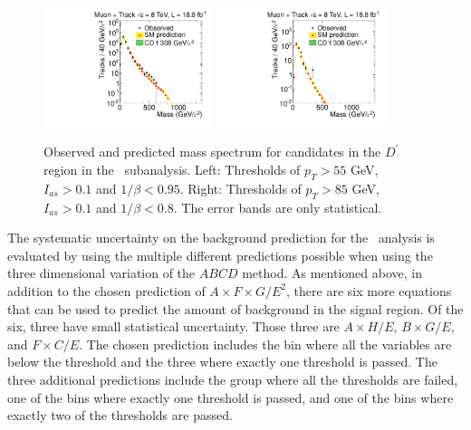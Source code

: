 \begin{figure}
 \begin{center}
  \includegraphics[clip=true, trim=0.0cm 0cm 2.8cm 0cm,width=0.44\textwidth]{figures/tkmu/RescaleNoRatio_Mass_Flip_8TeV_LooseNoSMMC}
  \includegraphics[clip=true, trim=0.0cm 0cm 2.8cm 0cm,width=0.44\textwidth]{figures/tkmu/RescaleNoRatio_Mass_Flip_8TeV_TightNoSMMC}
 \end{center}
 \caption[Observed and predicted mass spectrum for candidates in the \invbeta\ $<$ 1 region in the \tktof\ analysis.]
{Observed and predicted mass spectrum for candidates in the $D^\prime$ region in the \tktof\ subanalysis.
Left: Thresholds of $p_T > 55$ GeV, $I_{as} > 0.1$ and $1/\beta < 0.95$.
Right: Thresholds of $p_T > 85$ GeV, $I_{as} > 0.1$ and $1/\beta < 0.8$.
The error bands are only statistical.}
\label{fig:FlipMassDistribution}
\end{figure}

The systematic uncertainty on the background prediction for the \tktof\ analysis is evaluated by using the multiple different predictions possible when using the
three dimensional variation of the $ABCD$ method. As mentioned above, in addition to the chosen prediction of $A\times F\times G/E^2$, 
there are six more equations that can be used to predict
the amount of background in the signal region. Of the six, three have small statistical uncertainty. Those three are $A \times H/E$, $B \times G/E$, and $F \times C/E$.
The chosen prediction includes the bin where all the variables are below the threshold and the three where exactly one threshold is passed. The three additional predictions
include the group where all the thresholds are failed, one of the bins where exactly one threshold is passed, and one of the bins where exactly two of the
thresholds are passed.

